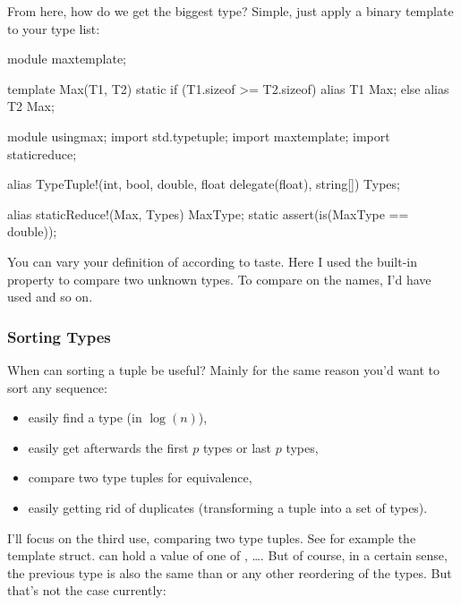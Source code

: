 From here, how do we get the biggest type? Simple, just apply a  binary template to your type list:

\begin{dcode}
module maxtemplate;

template Max(T1, T2)
{
    static if (T1.sizeof >= T2.sizeof)
        alias T1 Max;
    else
        alias T2 Max;
}
\end{dcode}

\begin{dcode}
module usingmax;
import std.typetuple;
import maxtemplate;
import staticreduce;

alias TypeTuple!(int, bool, double, float delegate(float), string[]) Types;

alias staticReduce!(Max, Types) MaxType;
static assert(is(MaxType == double));
\end{dcode}

You can vary your definition of  according to taste. Here I used the built-in  property to compare two unknown types. To compare on the names, I'd have used  and so on.

\subsubsection{Sorting Types}\label{sortingtypes}


When can sorting a tuple be useful? Mainly for the same reason you'd want to sort any sequence:

\begin{itemize}
\item easily find a type (in $\log(n)$),
\item easily get afterwards the first $p$ types or last $p$ types,
\item compare two type tuples for equivalence,
\item easily getting rid of duplicates (transforming a tuple into a set of types).
\end{itemize}

I'll focus on the third use, comparing two type tuples. See for example the  template struct.  can hold a value of one of , \ldots {}. But of course, in a certain sense, the previous type is also the same than  or any other reordering of the types. But that's not the case currently:

